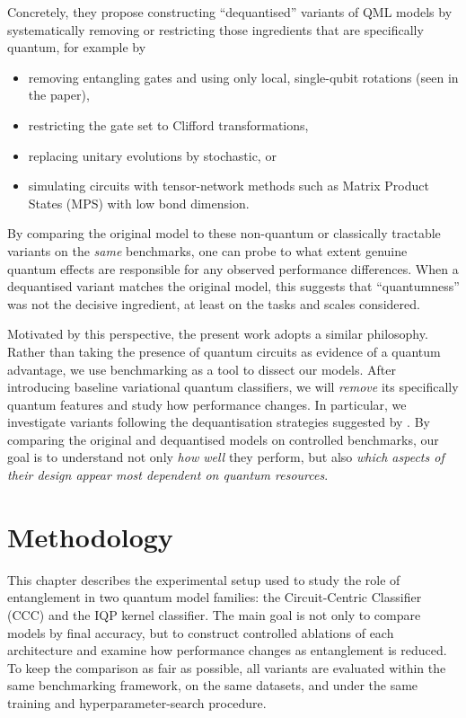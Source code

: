 \documentclass[12pt,a4paper,openany]{report}
\let\textcite\citet
\begin{document}
Concretely, they propose constructing ``dequantised'' variants of QML models by systematically removing or restricting those ingredients that are specifically quantum, for example by
\begin{itemize}
  \item removing entangling gates and using only local, single-qubit rotations (seen in the paper),
  \item restricting the gate set to Clifford transformations,
  \item replacing unitary evolutions by stochastic, or
  \item simulating circuits with tensor-network methods such as Matrix Product States (MPS) with low bond dimension.
\end{itemize}
By comparing the original model to these non-quantum or classically tractable variants on the \emph{same} benchmarks, one can probe to what extent genuine quantum effects are responsible for any observed performance differences. When a dequantised variant matches the original model, this suggests that ``quantumness'' was not the decisive ingredient, at least on the tasks and scales considered.


Motivated by this perspective, the present work adopts a similar philosophy. Rather than taking the presence of quantum circuits as evidence of a quantum advantage, we use benchmarking as a tool to dissect our models. After introducing baseline variational quantum classifiers, we will \emph{remove} its specifically quantum features and study how performance changes. In particular, we investigate variants following the dequantisation strategies suggested by \textcite{bowles2024better}. By comparing the original and dequantised models on controlled benchmarks, our goal is to understand not only \emph{how well} they perform, but also \emph{which aspects of their design appear most dependent on quantum resources}.



\chapter{Methodology}
\label{chap:methodology}

This chapter describes the experimental setup used to study the role of entanglement in two quantum model families: the Circuit-Centric Classifier (CCC) and the IQP kernel classifier. The main goal is not only to compare models by final accuracy, but to construct controlled ablations of each architecture and examine how performance changes as entanglement is reduced. To keep the comparison as fair as possible, all variants are evaluated within the same benchmarking framework, on the same datasets, and under the same training and hyperparameter-search procedure.
\end{document}

